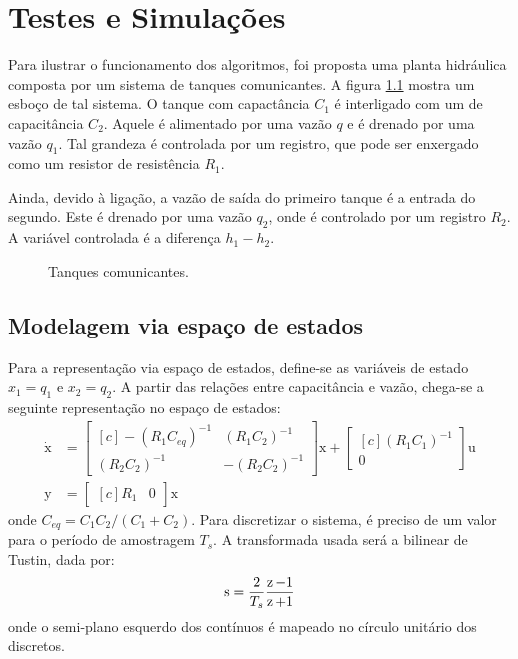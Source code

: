 \chapter{Testes e Simulações}

Para ilustrar o funcionamento dos algoritmos, foi proposta uma planta hidráulica composta por um sistema de tanques comunicantes. A figura \ref{fig:TanquesComunicantes} mostra um esboço de tal sistema. O tanque com capactância $C_1$ é interligado com um de capacitância $C_2$. Aquele é alimentado por uma vazão $q$ e é drenado por uma vazão $q_1$. Tal grandeza é controlada por um registro, que pode ser enxergado como um resistor de resistência $R_1$.

Ainda, devido à ligação, a vazão de saída do primeiro tanque é a entrada do segundo. Este é drenado por uma vazão $q_2$, onde é controlado por um registro $R_2$. A variável controlada é a diferença $h_1 - h_2$.

\begin{figure}[!ht]
  \centering
  
  \caption{Tanques comunicantes.}
  \label{fig:TanquesComunicantes}
\end{figure}

\section{Modelagem via espaço de estados}
Para a representação via espaço de estados, define-se as variáveis de estado $x_1 = q_1$ e $x_2 = q_2$. A partir das relações entre capacitância e vazão, chega-se a seguinte representação no espaço de estados:
\begin{subequations}
  \begin{align}
    \dot{\pmb{\mathrm{x}}} &= \begin{bmatrix*}[c]
      -(R_1C_{eq})^{-1} & (R_1C_2)^{-1}\\
      (R_2C_2)^{-1} & -(R_2C_2)^{-1}
    \end{bmatrix*}\pmb{\mathrm{x}} + \begin{bmatrix*}[c]
      (R_1C_1)^{-1}\\
      0
    \end{bmatrix*}\pmb{\mathrm{u}}\label{eq:SSTCEntrada}\\
    \pmb{\mathrm{y}} &= \begin{bmatrix*}[c]
      R_1 & 0
    \end{bmatrix*}\pmb{\mathrm{x}}\label{eq:SSTCSaida}
  \end{align}
\end{subequations}
onde $C_{eq} = C_1C_2/(C_1 + C_2)$. Para discretizar o sistema, é preciso de um valor para o período de amostragem $T_s$. A transformada usada será a bilinear de Tustin, dada por:
\begin{equation}
  \operatorname{\mathrm{s}} = \dfrac{2}{T_s}\dfrac{\operatorname{\mathrm{z}}-1}{\operatorname{\mathrm{z}}+1}\label{eq:BilinearTransform}
\end{equation}
onde o semi-plano esquerdo dos contínuos é mapeado no círculo unitário dos discretos.

